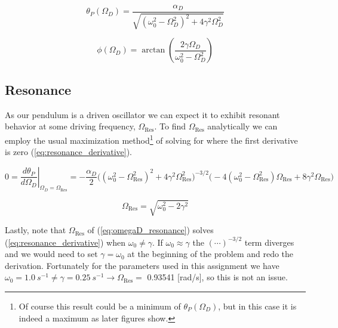 \documentclass[notitlepage,aps,prd,nofootinbib]{revtex4-1}
\begin{document}
\begin{equation} \label{eq:thetaP}
\theta_{P}\left(\Omega_{D}\right) = \frac{\alpha_{D}}{\sqrt{ \left(\omega_{0}^2 - \Omega_{D}^2\right)^2 + 4 \gamma^2 \Omega_{D}^2 }}
\end{equation}

\begin{equation} \label{eq:phi}
\phi\left(\Omega_{D}\right) = \arctan\left(\frac{2 \gamma \Omega_{D}}{\omega_{0}^2 - \Omega_{D}^2}\right)
\end{equation}

\subsection{Resonance}
\label{subsec:resonance}
As our pendulum is a driven oscillator we can expect it to exhibit resonant behavior at some driving frequency, $\Omega_{\text{Res}}$. To find $\Omega_{\text{Res}}$ analytically we can employ the usual maximization method\footnote{Of course this result could be a minimum of $\theta_{P}\left(\Omega_{D}\right)$, but in this case it is indeed a maximum as later figures show.} of solving for where the first derivative is zero (\ref{eq:resonance_derivative}).

\begin{equation} \label{eq:resonance_derivative}
0 = \left.\frac{d \theta_{P}}{d \Omega_{D}}\right|_{\Omega_{D} = \Omega_{\text{Res}}}
= -\frac{\alpha_{D}}{2} \bigg( \left(\omega_{0}^2 - \Omega_{\text{Res}}^2\right)^2 + 4 \gamma^2 \Omega_{\text{Res}}^2 \bigg)^{-3/2}
\bigg(- 4 \left(\omega_{0}^2 - \Omega_{\text{Res}}^2\right) \Omega_{\text{Res}} + 8 \gamma^2 \Omega_{\text{Res}} \bigg)
\end{equation}

\begin{equation} \label{eq:omegaD_resonance}
\Omega_{\text{Res}} = \sqrt{ \omega_{0}^2 - 2 \gamma^2} 
\end{equation}

Lastly, note that $\Omega_{\text{Res}}$ of (\ref{eq:omegaD_resonance}) solves (\ref{eq:resonance_derivative}) when $\omega_{0} \neq \gamma$. If $\omega_{0} \approx \gamma$ the $(\cdots)^{-3/2}$ term diverges and we would need to set $\gamma = \omega_{0}$ at the beginning of the problem and redo the derivation. Fortunately for the parameters used in this assignment we have $\omega_{0} = 1.0~s^{-1} \neq \gamma = 0.25~s^{-1} \rightarrow \Omega_{\text{Res}} =$ 0.93541 [rad/s], so this is not an issue.
\end{document}
